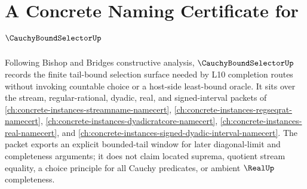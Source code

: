 \chapter{A Concrete Naming Certificate for $\CauchyBoundSelectorUp$}
\label{ch:concrete-instances-cauchy-bound-selector-namecert}

Following Bishop and Bridges constructive analysis, $\CauchyBoundSelectorUp$ records the finite tail-bound selection surface needed by L10 completion routes without invoking countable choice or a host-side least-bound oracle. It sits over the stream, regular-rational, dyadic, real, and signed-interval packets of \autoref{ch:concrete-instances-streamname-namecert}, \autoref{ch:concrete-instances-regseqrat-namecert}, \autoref{ch:concrete-instances-dyadicratcore-namecert}, \autoref{ch:concrete-instances-real-namecert}, and \autoref{ch:concrete-instances-signed-dyadic-interval-namecert}. The packet exports an explicit bounded-tail window for later diagonal-limit and completeness arguments; it does not claim located suprema, quotient stream equality, a choice principle for all Cauchy predicates, or ambient $\RealUp$ completeness.

